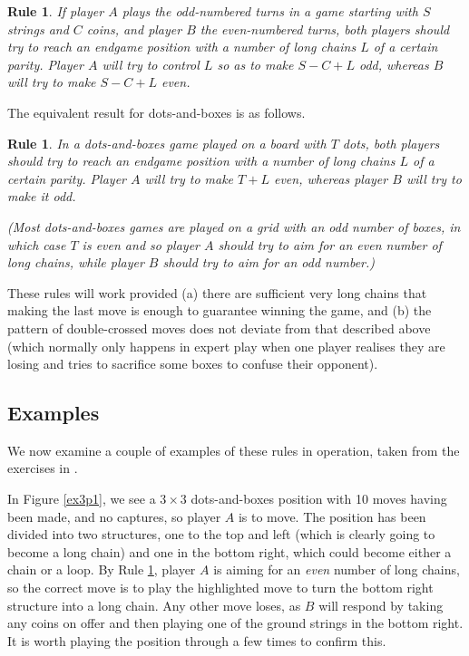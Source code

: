 \documentclass[a4paper,twocolumn]{article}
\newtheorem{parityruleofthumb}[thm]{Rule}
\newtheorem{dnbparityruleofthumb}[thm]{Rule}
\begin{document}
\begin{parityruleofthumb}\label{parityruleofthumb}
  If player $A$ plays the odd-numbered turns in a game starting with
  $S$ strings and $C$ coins, and player $B$ the even-numbered turns,
  both players should try to reach an endgame position with a number
  of long chains $L$ of a certain parity. Player $A$ will try to
  control $L$ so as to make $S-C+L$ \emph{odd}, whereas $B$ will try
  to make $S-C+L$ \emph{even}.
\end{parityruleofthumb}

The equivalent result for dots-and-boxes is as follows.

\begin{dnbparityruleofthumb}\label{dnbparityruleofthumb}
  In a dots-and-boxes game played on a board with $T$ dots, both
  players should try to reach an endgame position with a number of
  long chains $L$ of a certain parity. Player $A$ will try to make
  $T+L$ \emph{even}, whereas player $B$ will try to make it
  \emph{odd}.

  (Most dots-and-boxes games are played on a grid with an odd number
  of boxes, in which case $T$ is even and so player $A$ should try to
  aim for an even number of long chains, while player $B$ should try
  to aim for an odd number.)
\end{dnbparityruleofthumb}

These rules will work provided (a) there are sufficient very long
chains that making the last move is enough to guarantee winning the
game, and (b) the pattern of double-crossed moves does not deviate
from that described above (which normally only happens in expert play
when one player realises they are losing and tries to sacrifice some
boxes to confuse their opponent).

\subsection{Examples}

We now examine a couple of examples of these rules in operation, taken
from the exercises in \cite{berl}.

In Figure \ref{ex3p1}, we see a $3 \times 3$ dots-and-boxes position
with 10 moves having been made, and no captures, so player $A$ is to
move. The position has been divided into two structures, one to the
top and left (which is clearly going to become a long chain) and one
in the bottom right, which could become either a chain or a loop. By
Rule \ref{dnbparityruleofthumb}, player $A$ is aiming for an
\emph{even} number of long chains, so the correct move is to play the
highlighted move to turn the bottom right structure into a long
chain. Any other move loses, as $B$ will respond by taking any coins
on offer and then playing one of the ground strings in the bottom
right. It is worth playing the position through a few times to confirm
this.
\end{document}
